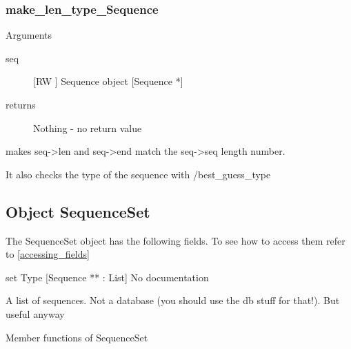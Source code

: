 \subsubsection{make_len_type_Sequence}

Arguments
\begin{description}
\item[seq] [RW   ] Sequence object [Sequence *]
\item[returns] Nothing - no return value
\end{description}
makes seq->len and seq->end match the seq->seq
length number. 


It also checks the type of the sequence with
/best_guess_type


\subsection{Object SequenceSet}

\label{object_SequenceSet}

The SequenceSet object has the following fields. To see how to access them refer to \ref{accessing_fields}
\begin{description}
\item{set} Type [Sequence ** : List] No documentation

\end{description}
A list of sequences. Not a database (you should
use the db stuff for that!). But useful anyway




Member functions of SequenceSet

